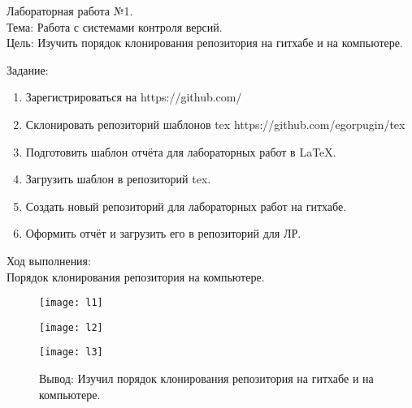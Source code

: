 \begin{center}
Лабораторная работа №1.
\\
Тема: Работа с системами контроля версий.
\\
Цель: Изучить порядок клонирования репозитория на гитхабе и на компьютере.
 
\end{center}
Задание:
\begin{enumerate}
\item Зарегистрироваться на https://github.com/

\item Склонировать репозиторий шаблонов tex https://github.com/egorpugin/tex
 
\item Подготовить шаблон отчёта для лабораторных работ в LaTeX.

\item Загрузить шаблон в репозиторий tex.

\item Создать новый репозиторий для лабораторных работ на гитхабе.

\item Оформить отчёт и загрузить его в репозиторий для ЛР.
\end{enumerate}
Ход выполнения:
\\
Порядок клонирования репозитория на компьютере.

\begin{figure}[h]
\centering
\texttt{[image: l1]}

\label{fig:l1}
\end{figure}

\begin{figure}[h]
\centering
\texttt{[image: l2]}

\label{fig:l2}
\end{figure}

\begin{figure}[h]
\centering
\texttt{[image: l3]}

\label{fig:l3}
Вывод: Изучил порядок клонирования репозитория на гитхабе и на компьютере.
\end{figure}



